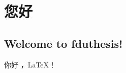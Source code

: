 \documentclass{fduthesis}
\begin{document}
  \chapter{您好}
  \section{Welcome to fduthesis!}
  你好 ，\LaTeX{}！
\end{document}
